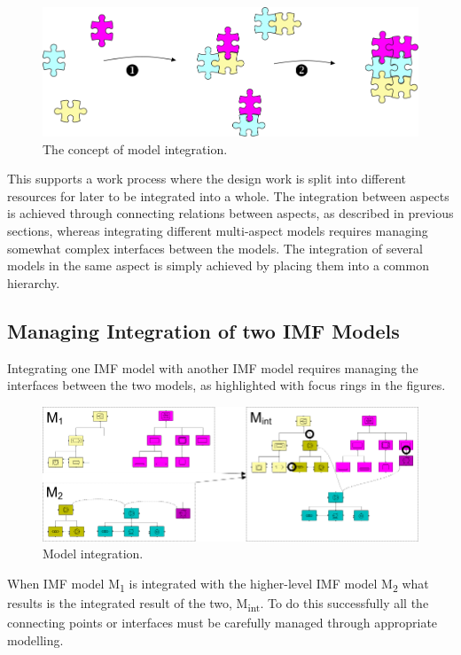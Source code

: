\documentclass[../main.tex]{subfiles}
\begin{document}
\begin{figure}[htb]
  \centering
  \includegraphics[width=.96\textwidth]{img/IMFmanual-img060.png}
  \caption{The concept of model integration.}
  \label{fig:Figure 41}
\end{figure}

This supports a work process where the design work is split into different resources for later to be integrated into a
whole. The integration between aspects is achieved through connecting relations between aspects, as described in
previous sections, whereas integrating different multi-aspect models requires managing somewhat complex interfaces
between the models. The integration of several models in the same aspect is simply achieved by placing them into a
common hierarchy.

\subsection{Managing Integration of two IMF Models}
Integrating one IMF model with another IMF model requires managing the interfaces between
the two models, as highlighted with focus rings in the figures.

\begin{figure}[htb]\centering
  \includegraphics[width=1\textwidth]{img/IMFmanual-img061.png}
  \caption{Model integration.}
  \label{fig:Figure 42}
\end{figure}

When IMF model M\textsubscript{1} is integrated with the higher-level IMF model M\textsubscript{2} what results is
the integrated result of the two, M\textsubscript{int}. To do this successfully all the connecting points or
interfaces must be carefully managed through appropriate modelling.
\end{document}
